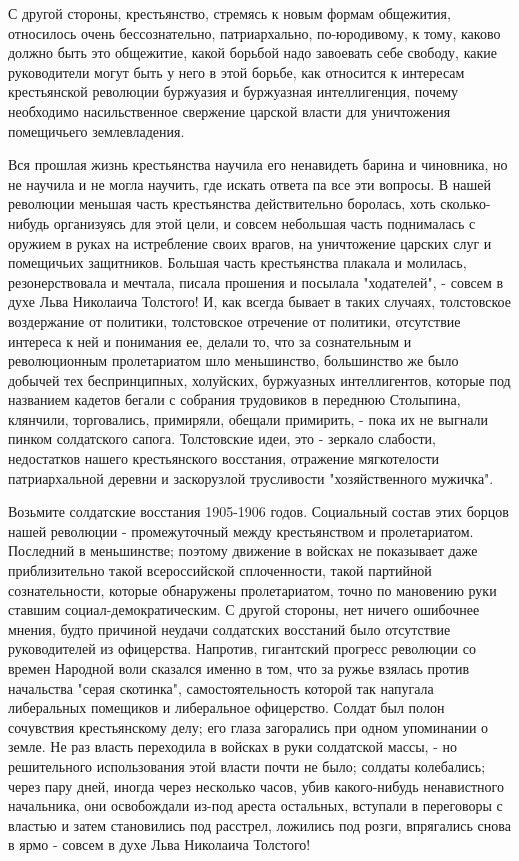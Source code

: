 \documentclass[12pt]{article}
\newcommand{\parnum}{(\arabic{parcount})}
\newcounter{parcount}
\newenvironment{parnumbers}{%
  \par%
  \everypar{\noindent \stepcounter{parcount}\marginpar[]{\parnum}}%
}{}
\begin{document}
\begin{parnumbers}
С другой стороны, крестьянство, стремясь к новым формам общежития, относилось очень бессознательно, патриархально, по-юродивому, к тому, каково должно быть это общежитие, какой борьбой надо завоевать себе свободу, какие руководители могут быть у него в этой борьбе, как относится к интересам крестьянской революции буржуазия и буржуазная интеллигенция, почему необходимо насильственное свержение царской власти для уничтожения помещичьего землевладения.

Вся прошлая жизнь крестьянства научила его ненавидеть барина и чиновника, но не научила и не могла научить, где искать ответа па все эти вопросы. В нашей революции меньшая часть крестьянства действительно боролась, хоть сколько-нибудь организуясь для этой цели, и совсем небольшая часть поднималась с оружием в руках на истребление своих врагов, на уничтожение царских слуг и помещичьих защитников. Большая часть крестьянства плакала и молилась, резонерствовала и мечтала, писала прошения и посылала "ходателей", - совсем в духе Льва Николаича Толстого! И, как всегда бывает в таких случаях, толстовское воздержание от политики, толстовское отречение от политики, отсутствие интереса к ней и понимания ее, делали то, что за сознательным и революционным пролетариатом шло меньшинство, большинство же было добычей тех беспринципных, холуйских, буржуазных интеллигентов, которые под названием кадетов бегали с собрания трудовиков в переднюю Столыпина, клянчили, торговались, примиряли, обещали примирить, - пока их не выгнали пинком солдатского сапога. Толстовские идеи, это - зеркало слабости, недостатков нашего крестьянского восстания, отражение мягкотелости патриархальной деревни и заскорузлой трусливости "хозяйственного мужичка".

Возьмите солдатские восстания 1905-1906 годов. Социальный состав этих борцов нашей революции - промежуточный между крестьянством и пролетариатом. Последний в меньшинстве; поэтому движение в войсках не показывает даже приблизительно такой всероссийской сплоченности, такой партийной сознательности, которые обнаружены пролетариатом, точно по мановению руки ставшим социал-демократическим. С другой стороны, нет ничего ошибочнее мнения, будто причиной неудачи солдатских восстаний было отсутствие руководителей из офицерства. Напротив, гигантский прогресс революции со времен Народной воли сказался именно в том, что за ружье взялась против начальства "серая скотинка", самостоятельность которой так напугала либеральных помещиков и либеральное офицерство. Солдат был полон сочувствия крестьянскому делу; его глаза загорались при одном упоминании о земле. Не раз власть переходила в войсках в руки солдатской массы, - но решительного использования этой власти почти не было; солдаты колебались; через пару дней, иногда через несколько часов, убив какого-нибудь ненавистного начальника, они освобождали из-под ареста остальных, вступали в переговоры с властью и затем становились под расстрел, ложились под розги, впрягались снова в ярмо - совсем в духе Льва Николаича Толстого!


\end{parnumbers}
\end{document}
